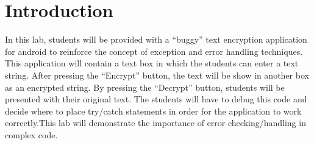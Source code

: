 \section{Introduction}

In this lab, students will be provided with a “buggy” text encryption application for android to reinforce the concept of exception and error handling techniques. This application will contain a text box in which the students can enter a text string.  After pressing the “Encrypt” button, the text will be show in another box as an encrypted string. By pressing the “Decrypt” button, students will be presented with their original text. The students will have to debug this code and decide where to place try/catch statements in order for the application to work correctly.This lab will demonstrate the importance of error checking/handling in complex code.

